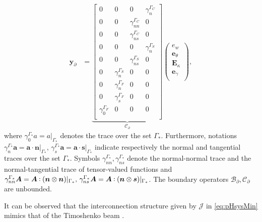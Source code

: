 \begin{equation}
\begin{aligned}
\bm{y}_\partial &= \underbrace{
\begin{bmatrix}
{0} & {0} & {0} & \gamma_{n}^{\Gamma_C} \\
{0} & {0} & \gamma_{nn}^{\Gamma_C} & {0} \\
{0} & {0} & \gamma_{ns}^{\Gamma_C} & {0} \\
{0} & {0} & {0} & \gamma_{n}^{\Gamma_S} \\
{0} & {0} & \gamma_{ns}^{\Gamma_S} & {0} \\
{0} & \gamma_{n}^{\Gamma_S} & {0} & {0} \\
{0} & \gamma_{n}^{\Gamma_F} & {0} & {0} \\
{0} & \gamma_{s}^{\Gamma_F} & {0} & {0} \\
\gamma_{0}^{\Gamma_F} & {0} & {0} & {0} \\
\end{bmatrix}}_{\mathcal{C}_\partial}
\begin{pmatrix}
e_w \\
\bm{e}_{\theta} \\
\bm{E}_{\kappa} \\
\bm{e}_{\gamma} \\
\end{pmatrix},
\end{aligned}
\end{equation}
where $\gamma_{0}^{\Gamma_*}a = a\vert_{\Gamma_*}$ denotes the trace over the set $\Gamma_*$. Furthermore, notations $\gamma_{n}^{\Gamma_*}\bm{a} = \bm{a} \cdot \bm{n}\vert_{\Gamma_*}, \,  \gamma_{s}^{\Gamma_*}\bm{a}= \bm{a} \cdot \bm{s}\vert_{\Gamma_*}$ indicate respectively the normal and tangential traces over the set $\Gamma_*$. Symbols $\gamma_{nn}^{\Gamma_*}, \gamma_{ns}^{\Gamma_*}$ denote the normal-normal trace and the normal-tangential trace of tensor-valued functions and $\gamma_{nn}^{\Gamma_*}\bm{A} = \bm{A} \cddot (\bm{n} \otimes \bm{n})\vert_{\Gamma_*}, \, \gamma_{ns}^{\Gamma_*}\bm{A} = \bm{A} \cddot (\bm{n} \otimes \bm{s})\vert_{\Gamma_*}$. The boundary operators $\mathcal{B}_\partial, \mathcal{C}_\partial$ are unbounded. 

\begin{remark}
	It can be observed that the interconnection structure given by $\mathcal{J}$ in \eqref{eq:pHsysMin} mimics that of the Timoshenko beam \cite[Chapter 7]{zwart2012}.
\end{remark}

